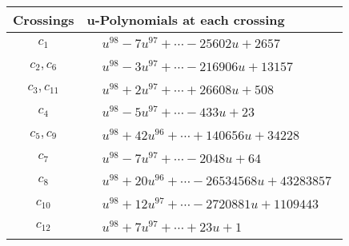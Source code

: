\documentclass[1p]{elsarticle_modified}
\theoremstyle{definition}
\begin{document}
\begin{tabular}{m{50pt}|m{274pt}}
Crossings & \hspace{64pt}u-Polynomials at each crossing \\
\hline $$\begin{aligned}c_{1}\end{aligned}$$&$\begin{aligned}
&u^{98}-7 u^{97}+\cdots-25602 u+2657
\end{aligned}$\\
\hline $$\begin{aligned}c_{2},c_{6}\end{aligned}$$&$\begin{aligned}
&u^{98}-3 u^{97}+\cdots-216906 u+13157
\end{aligned}$\\
\hline $$\begin{aligned}c_{3},c_{11}\end{aligned}$$&$\begin{aligned}
&u^{98}+2 u^{97}+\cdots+26608 u+508
\end{aligned}$\\
\hline $$\begin{aligned}c_{4}\end{aligned}$$&$\begin{aligned}
&u^{98}-5 u^{97}+\cdots-433 u+23
\end{aligned}$\\
\hline $$\begin{aligned}c_{5},c_{9}\end{aligned}$$&$\begin{aligned}
&u^{98}+42 u^{96}+\cdots+140656 u+34228
\end{aligned}$\\
\hline $$\begin{aligned}c_{7}\end{aligned}$$&$\begin{aligned}
&u^{98}-7 u^{97}+\cdots-2048 u+64
\end{aligned}$\\
\hline $$\begin{aligned}c_{8}\end{aligned}$$&$\begin{aligned}
&u^{98}+20 u^{96}+\cdots-26534568 u+43283857
\end{aligned}$\\
\hline $$\begin{aligned}c_{10}\end{aligned}$$&$\begin{aligned}
&u^{98}+12 u^{97}+\cdots-2720881 u+1109443
\end{aligned}$\\
\hline $$\begin{aligned}c_{12}\end{aligned}$$&$\begin{aligned}
&u^{98}+7 u^{97}+\cdots+23 u+1
\end{aligned}$\\
\hline
\end{tabular}\\~\\
\end{document}
